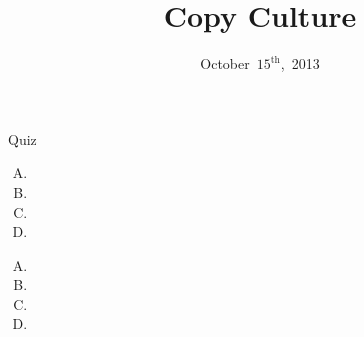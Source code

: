 \documentclass{beamer}
\title{Copy Culture}
\date{October~$15^{\text{th}}$,~2013}
\begin{document}
\begin{frame}
\titlepage
\end{frame}

\begin{frame}{Quiz}

\begin{enumerate}[(A)]
\item<1>
\item<1-2>
\item<1>
\item<1>
\end{enumerate}
\bigskip
\begin{enumerate}[(A)]
\item<1-2>
\item<1>
\item<1>
\item<1>
\end{enumerate}
\end{frame}
\end{document}
